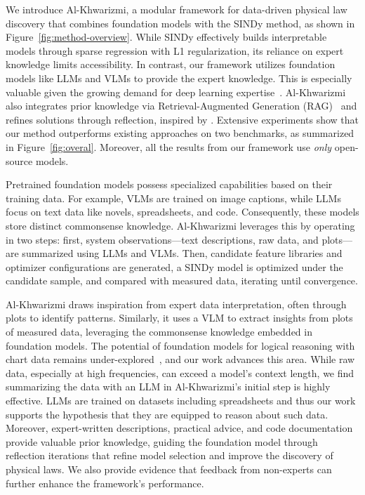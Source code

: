 \documentclass{article}
\begin{document}
We introduce Al-Khwarizmi, a modular framework for data-driven physical law discovery that combines foundation models with the SINDy method, as shown in Figure~\ref{fig:method-overview}. 
While SINDy effectively builds interpretable models through sparse regression with L1 regularization, its reliance on expert knowledge limits accessibility. 
In contrast, our framework utilizes foundation models like LLMs and VLMs to provide the expert knowledge. 
This is especially valuable given the growing demand for deep learning expertise~\cite{ALEKSEEVA2021102002}. 
Al-Khwarizmi also integrates prior knowledge via Retrieval-Augmented Generation (RAG)~\cite{NEURIPS2020_6b493230} and refines solutions through reflection, inspired by \cite{Mengge24}. 
Extensive experiments show that our method outperforms existing approaches on two benchmarks, as summarized in Figure~\ref{fig:overal}.
Moreover, all the results from our framework use \textit{only} open-source models.

Pretrained foundation models possess specialized capabilities based on their training data. 
For example, VLMs are trained on image captions, while LLMs focus on text data like novels, spreadsheets, and code. 
Consequently, these models store distinct commonsense knowledge. 
Al-Khwarizmi leverages this by operating in two steps: 
first, system observations—text descriptions, raw data, and plots—are summarized using LLMs and VLMs. 
Then, candidate feature libraries and optimizer configurations are generated, a SINDy model is optimized under the candidate sample, and compared with measured data, iterating until convergence.

Al-Khwarizmi draws inspiration from expert data interpretation, often through plots to identify patterns. 
Similarly, it uses a VLM to extract insights from plots of measured data, leveraging the commonsense knowledge embedded in foundation models. 
The potential of foundation models for logical reasoning with chart data remains under-explored~\cite{xia2024chartx}, and our work advances this area. 
While raw data, especially at high frequencies, can exceed a model's context length, we find summarizing the data with an LLM in Al-Khwarizmi’s initial step is highly effective. 
LLMs are trained on datasets including spreadsheets and thus our work supports the hypothesis that they are equipped to reason about such data.
Moreover, expert-written descriptions, practical advice, and code documentation provide valuable prior knowledge, guiding the foundation model through reflection iterations that refine model selection and improve the discovery of physical laws. 
We also provide evidence that feedback from non-experts can further enhance the framework's performance.
\end{document}
